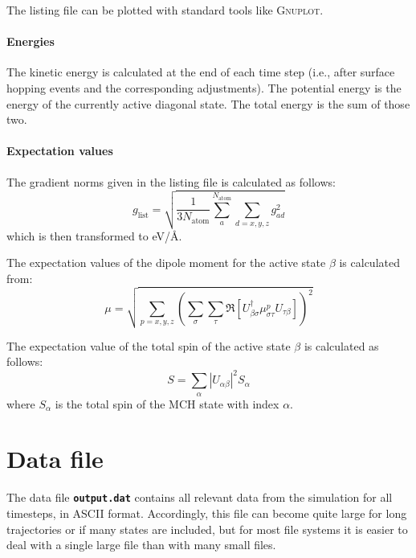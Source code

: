 \documentclass[a4paper,11pt,DIV=15,openany,twoside=false]{scrbook}
\newcommand{\ttt}[1]{\textbf{\texttt{#1}}}
\begin{document}
The listing file can be plotted with standard tools like \textsc{Gnuplot}. 

\paragraph{Energies}

The kinetic energy is calculated at the end of each time step (i.e., after surface hopping events and the corresponding adjustments). The potential energy is the energy of the currently active diagonal state. The total energy is the sum of those two.

\paragraph{Expectation values}

The gradient norms given in the listing file is calculated as follows:
\begin{equation}
  g_\text{list}=\sqrt{\frac{1}{3N_\text{atom}}\sum\limits_a^{N_\text{atom}}\sum_{d=x,y,z} g_{ad}^2}
\end{equation}
which is then transformed to eV/\AA.

The expectation values of the dipole moment for the active state $\beta$ is calculated from:
\begin{equation}
  \mu=\sqrt{\sum\limits_{p=x,y,z} 
  \left(
    \sum\limits_\sigma\sum\limits_\tau
    \Re\left[
      U_{\beta\sigma}^\dagger \mu_{\sigma\tau}^p U_{\tau\beta}
    \right]
  \right)^2}
\end{equation}

The expectation value of the total spin of the active state $\beta$ is calculated as follows:
\begin{equation}
  S=\sum_\alpha |U_{\alpha\beta}|^2 S_\alpha
\end{equation}
where $S_\alpha$ is the total spin of the MCH state with index $\alpha$.

\section{Data file}\label{sec:datfile}

The data file \ttt{output.dat} contains all relevant data from the simulation for all timesteps, in ASCII format. Accordingly, this file can become quite large for long trajectories or if many states are included, but for most file systems it is easier to deal with a single large file than with many small files.
\end{document}
